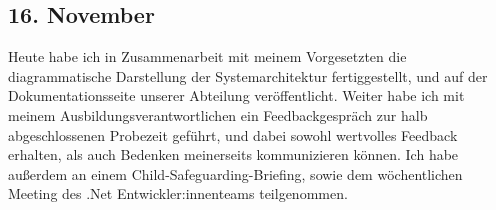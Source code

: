 \subsection{16. November}
Heute habe ich in Zusammenarbeit mit meinem Vorgesetzten die diagrammatische Darstellung der Systemarchitektur fertiggestellt, und auf der Dokumentationsseite unserer Abteilung veröffentlicht. Weiter habe ich mit meinem Ausbildungsverantwortlichen ein Feedbackgespräch zur halb abgeschlossenen Probezeit geführt, und dabei sowohl wertvolles Feedback erhalten, als auch Bedenken meinerseits kommunizieren können. Ich habe außerdem an einem Child-Safeguarding-Briefing, sowie dem wöchentlichen Meeting des .Net Entwickler:innenteams teilgenommen.